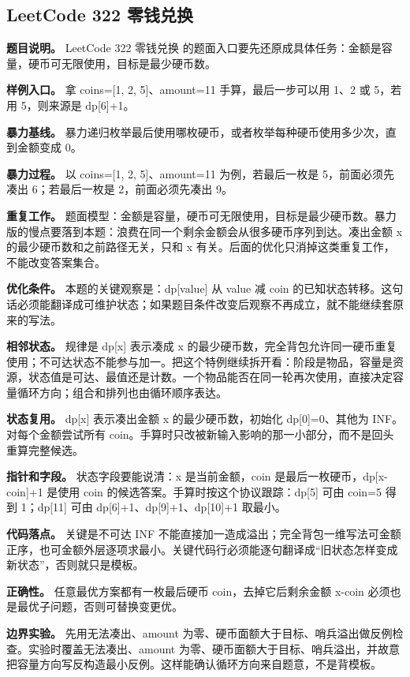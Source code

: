 \subsection{LeetCode 322 零钱兑换}

\textbf{题目说明。} LeetCode 322 零钱兑换 的题面入口要先还原成具体任务：金额是容量，硬币可无限使用，目标是最少硬币数。

\textbf{样例入口。} 拿 coins=[1, 2, 5]、amount=11 手算，最后一步可以用 1、2 或 5，若用 5，则来源是 dp[6]+1。

\textbf{暴力基线。} 暴力递归枚举最后使用哪枚硬币，或者枚举每种硬币使用多少次，直到金额变成 0。

\textbf{暴力过程。} 以 coins=[1, 2, 5]、amount=11 为例，若最后一枚是 5，前面必须先凑出 6；若最后一枚是 2，前面必须先凑出 9。

\textbf{重复工作。} 题面模型：金额是容量，硬币可无限使用，目标是最少硬币数。暴力版的慢点要落到本题：浪费在同一个剩余金额会从很多硬币序列到达。凑出金额 x 的最少硬币数和之前路径无关，只和 x 有关。后面的优化只消掉这类重复工作，不能改变答案集合。

\textbf{优化条件。} 本题的关键观察是：dp[value] 从 value 减 coin 的已知状态转移。这句话必须能翻译成可维护状态；如果题目条件改变后观察不再成立，就不能继续套原来的写法。

\textbf{相邻状态。} 规律是 dp[x] 表示凑成 x 的最少硬币数，完全背包允许同一硬币重复使用；不可达状态不能参与加一。把这个特例继续拆开看：阶段是物品，容量是资源，状态值是可达、最值还是计数。一个物品能否在同一轮再次使用，直接决定容量循环方向；组合和排列也由循环顺序表达。

\textbf{状态复用。} dp[x] 表示凑出金额 x 的最少硬币数，初始化 dp[0]=0、其他为 INF。对每个金额尝试所有 coin。手算时只改被新输入影响的那一小部分，而不是回头重算完整候选。

\textbf{指针和字段。} 状态字段要能说清：x 是当前金额，coin 是最后一枚硬币，dp[x-coin]+1 是使用 coin 的候选答案。手算时按这个协议跟踪：dp[5] 可由 coin=5 得到 1；dp[11] 可由 dp[6]+1、dp[9]+1、dp[10]+1 取最小。

\textbf{代码落点。} 关键是不可达 INF 不能直接加一造成溢出；完全背包一维写法可金额正序，也可金额外层逐项求最小。关键代码行必须能逐句翻译成“旧状态怎样变成新状态”，否则就只是模板。

\textbf{正确性。} 任意最优方案都有一枚最后硬币 coin，去掉它后剩余金额 x-coin 必须也是最优子问题，否则可替换变更优。

\textbf{边界实验。} 先用无法凑出、amount 为零、硬币面额大于目标、哨兵溢出做反例检查。实验时覆盖无法凑出、amount 为零、硬币面额大于目标、哨兵溢出，并故意把容量方向写反构造最小反例。这样能确认循环方向来自题意，不是背模板。

